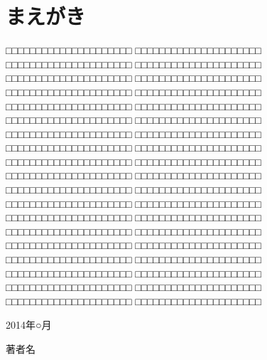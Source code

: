 \chapter*{まえがき}
□□□□□□□□□□□□□□□□□□□□□
□□□□□□□□□□□□□□□□□□□□□
□□□□□□□□□□□□□□□□□□□□□
□□□□□□□□□□□□□□□□□□□□□
□□□□□□□□□□□□□□□□□□□□□
□□□□□□□□□□□□□□□□□□□□□
□□□□□□□□□□□□□□□□□□□□□
□□□□□□□□□□□□□□□□□□□□□
□□□□□□□□□□□□□□□□□□□□□
□□□□□□□□□□□□□□□□□□□□□
□□□□□□□□□□□□□□□□□□□□□
□□□□□□□□□□□□□□□□□□□□□
□□□□□□□□□□□□□□□□□□□□□
□□□□□□□□□□□□□□□□□□□□□
□□□□□□□□□□□□□□□□□□□□□
□□□□□□□□□□□□□□□□□□□□□
□□□□□□□□□□□□□□□□□□□□□
□□□□□□□□□□□□□□□□□□□□□
□□□□□□□□□□□□□□□□□□□□□
□□□□□□□□□□□□□□□□□□□□□
□□□□□□□□□□□□□□□□□□□□□
□□□□□□□□□□□□□□□□□□□□□
□□□□□□□□□□□□□□□□□□□□□
□□□□□□□□□□□□□□□□□□□□□
□□□□□□□□□□□□□□□□□□□□□
□□□□□□□□□□□□□□□□□□□□□
□□□□□□□□□□□□□□□□□□□□□
□□□□□□□□□□□□□□□□□□□□□
□□□□□□□□□□□□□□□□□□□□□
□□□□□□□□□□□□□□□□□□□□□
□□□□□□□□□□□□□□□□□□□□□
□□□□□□□□□□□□□□□□□□□□□
□□□□□□□□□□□□□□□□□□□□□
□□□□□□□□□□□□□□□□□□□□□
□□□□□□□□□□□□□□□□□□□□□
□□□□□□□□□□□□□□□□□□□□□
□□□□□□□□□□□□□□□□□□□□□
□□□□□□□□□□□□□□□□□□□□□


\vspace{\baselineskip}
2014年○月

\hspace*{\fill}著者名

